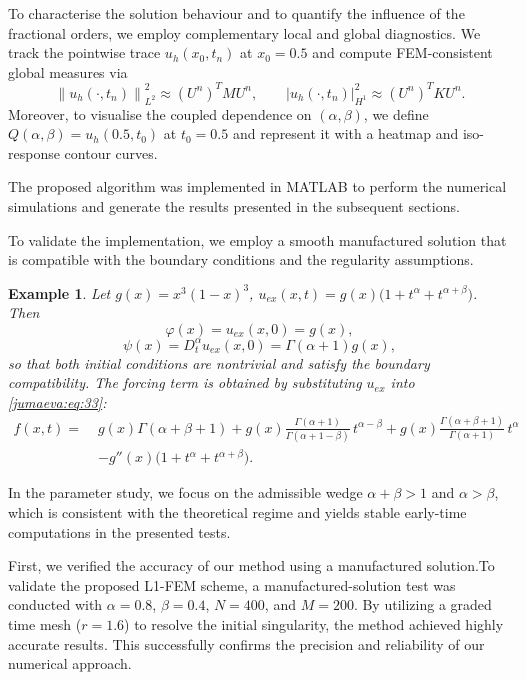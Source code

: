 \documentclass{amsart}
\numberwithin{equation}{section}
\newtheorem{ex}[thm]{Example}
\begin{document}
To characterise the solution behaviour and to quantify the influence of the fractional orders, we employ complementary local and global diagnostics. 
We track the pointwise trace $u_h(x_0,t_n)$ at $x_0=0.5$ and compute FEM-consistent global measures via 
\begin{equation}
\left\lVert u_h(\cdot,t_n)\right\rVert_{L^2}^2\approx (U^n)^{T} M U^n, \qquad
\left\lvert u_h(\cdot,t_n)\right\rvert_{H^1}^2\approx (U^n)^{T} K U^n.\label{jumaeva:eq:40}
\end{equation}
Moreover, to visualise the coupled dependence on $(\alpha,\beta)$, we define $Q(\alpha,\beta)=u_h(0.5,t_0)$ at $t_0=0.5$ and represent it with a heatmap and iso-response contour curves.

The proposed algorithm was implemented in MATLAB to perform the numerical simulations and generate the results presented in the subsequent sections.

To validate the implementation, we employ a smooth manufactured solution that is compatible with the boundary conditions and the regularity assumptions.
\begin{ex}
     Let $ g(x)=x^3(1-x)^3$, $u_{ex}(x,t)=g(x)\big(1+t^\alpha+t^{\alpha+\beta}\big)$. Then
\begin{equation*}
\varphi(x)=u_{ex}(x,0)=g(x),
\end{equation*} 
\begin{equation*}
\psi(x)=D_t^\alpha u_{ex}(x,0)=\Gamma(\alpha+1)g(x),
\end{equation*}
so that both initial conditions are nontrivial and satisfy the boundary compatibility.
The forcing term is obtained by substituting $u_{ex}$ into \eqref{jumaeva:eq:33}:
\begin{equation}
\begin{aligned}
f(x,t)=\;&g(x)\Gamma(\alpha+\beta+1)
+ g(x)\frac{\Gamma(\alpha+1)}{\Gamma(\alpha+1-\beta)}\,t^{\alpha-\beta}
+ g(x)\frac{\Gamma(\alpha+\beta+1)}{\Gamma(\alpha+1)}\,t^\alpha\\
&- g''(x)\big(1+t^\alpha+t^{\alpha+\beta}\big).
\end{aligned}\label{jumaeva:eq:41}
\end{equation}
\end{ex}
In the parameter study, we focus on the admissible wedge
$ \alpha+\beta>1$ and $\alpha>\beta$, which is consistent with the theoretical regime and yields stable early-time computations in the presented tests.

First, we verified the accuracy of our method using a manufactured solution.To validate the proposed L1-FEM scheme, a manufactured-solution test was conducted with $\alpha=0.8$, $\beta=0.4$, $N=400$, and $M=200$. By utilizing a graded time mesh ($r=1.6$) to resolve the initial singularity, the method achieved highly accurate results. This successfully confirms the precision and reliability of our numerical approach. 
\end{document}
